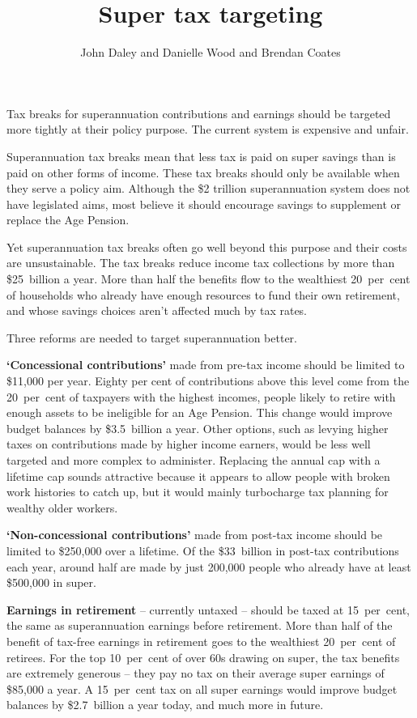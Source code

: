 \documentclass{grattanAlpha}
\title{Super tax targeting}
\author{John Daley and Danielle Wood and Brendan Coates}
\begin{document}
\newlength{\overviewextra}
\setlength{\overviewextra}{2pt}
\addtolength{\columnsep}{\overviewextra}
\begin{overview}[-25pt]
Tax breaks for superannuation contributions and earnings should be targeted more tightly at their policy purpose. The current system is expensive and unfair. 

Superannuation tax breaks mean that less tax is paid on super savings than is paid on other forms of income. These tax breaks should only be available when they serve a policy aim. Although the \$2 trillion superannuation system does not have legislated aims, most believe it should encourage savings to supplement or replace the Age Pension. 

Yet superannuation tax breaks often go well beyond this purpose and their costs are unsustainable. The tax breaks reduce income tax collections by more than \$25~billion a year. More than half the benefits flow to the wealthiest 20~per~cent of households who already have enough resources to fund their own retirement, and whose savings choices aren’t affected much by tax rates. 

Three reforms are needed to target superannuation better.

\textbf{‘Concessional contributions’} made from pre-tax income should be limited to \$11,000 per year. Eighty per cent of contributions above this level come from the 20~per~cent of taxpayers with the highest incomes, people likely to retire with enough assets to be ineligible for an Age Pension. This change would improve budget balances by \$3.5~billion a year. Other options, such as levying higher taxes on contributions made by higher income earners, would be less well targeted and more complex to administer. Replacing the annual cap with a lifetime cap sounds attractive because it appears to allow people with broken work histories to catch up, but it would mainly turbocharge tax planning for wealthy older workers.

\textbf{‘Non-concessional contributions’} made from post-tax income
should be limited to \$250,000 over a lifetime. Of the \$33~billion in
post-tax contributions each year, around half are made by just
200,000 people who already have at least \$500,000 in super.


\textbf{Earnings in retirement} – currently untaxed – should be taxed at 15~per~cent, the same as superannuation earnings before retirement. More than half of the benefit of tax-free earnings in retirement goes to the wealthiest 20~per~cent of retirees. For the top 10~per~cent of over 60s drawing on super, the tax benefits are extremely generous – they pay no tax on their average super earnings of \$85,000 a year. A 15~per~cent tax on all super earnings would improve budget balances by \$2.7~billion a year today, and much more in future. 


\end{overview}
\end{document}
